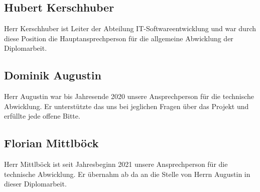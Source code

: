 \subsection{Hubert Kerschhuber}
Herr Kerschhuber ist Leiter der Abteilung IT-Softwareentwicklung und war durch diese Position die Hauptansprechperson für die allgemeine Abwicklung der Diplomarbeit.
\subsection{Dominik Augustin}
Herr Augustin war bis Jahresende 2020 unsere Ansprechperson für die technische Abwicklung. Er unterstützte das uns bei jeglichen Fragen über das Projekt und erfüllte jede offene Bitte.
\subsection{Florian Mittlböck}
Herr Mittlböck ist seit Jahresbeginn 2021 unsere Ansprechperson für die technische Abwicklung. Er übernahm ab da an die Stelle von Herrn Augustin in dieser Diplomarbeit.